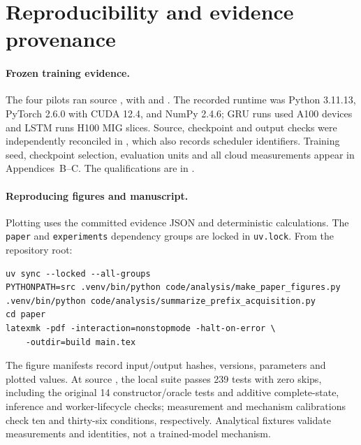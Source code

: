 \section{Reproducibility and evidence provenance}
\label{sec:reproducibility}

\paragraph{Frozen training evidence.}
The four pilots ran source , with  and . The recorded runtime was Python 3.11.13, PyTorch 2.6.0 with CUDA 12.4, and NumPy 2.4.6; GRU runs used A100 devices and LSTM runs H100 MIG slices. Source, checkpoint and output checks were independently reconciled in , which also records scheduler identifiers. Training seed, checkpoint selection, evaluation units and all cloud measurements appear in Appendices~B--C. The qualifications are in .

\paragraph{Reproducing figures and manuscript.}
Plotting uses the committed evidence JSON and deterministic calculations. The \texttt{paper} and \texttt{experiments} dependency groups are locked in \texttt{uv.lock}. From the repository root:
\par\noindent
\begin{minipage}{\linewidth}
\small
\begin{verbatim}
uv sync --locked --all-groups
PYTHONPATH=src .venv/bin/python code/analysis/make_paper_figures.py
.venv/bin/python code/analysis/summarize_prefix_acquisition.py
cd paper
latexmk -pdf -interaction=nonstopmode -halt-on-error \
    -outdir=build main.tex
\end{verbatim}
\end{minipage}
\par

The figure manifests record input/output hashes, versions, parameters and plotted values. At source , the local suite passes 239 tests with zero skips, including the original 14 constructor/oracle tests and additive complete-state, inference and worker-lifecycle checks; measurement and mechanism calibrations check ten and thirty-six conditions, respectively. Analytical fixtures validate measurements and identities, not a trained-model mechanism.

